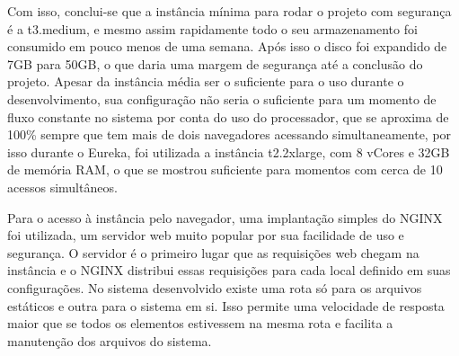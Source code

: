 \indent
\par Com isso, conclui-se que a instância mínima para rodar o projeto com segurança é a t3.medium, e mesmo assim rapidamente todo o seu armazenamento foi consumido em pouco menos de uma semana. Após isso o disco foi expandido de 7GB para 50GB, o que daria uma margem de segurança até a conclusão do projeto. Apesar da instância média ser o suficiente para o uso durante o desenvolvimento, sua configuração não seria o suficiente para um momento de fluxo constante no sistema por conta do uso do processador, que se aproxima de 100\% sempre que tem mais de dois navegadores acessando simultaneamente, por isso durante o Eureka, foi utilizada a instância t2.2xlarge, com 8 vCores e 32GB de memória RAM, o que se mostrou suficiente para momentos com cerca de 10 acessos simultâneos.

\par Para o acesso à instância pelo navegador, uma implantação simples do NGINX \cite{NGINX} foi utilizada, um servidor web muito popular por sua facilidade de uso e segurança. O servidor é o primeiro lugar que as requisições web chegam na instância e o NGINX distribui essas requisições para cada local definido em suas configurações. No sistema desenvolvido existe uma rota só para os arquivos estáticos e outra para o sistema em si. Isso permite uma velocidade de resposta maior que se todos os elementos estivessem na mesma rota e facilita a manutenção dos arquivos do sistema.




